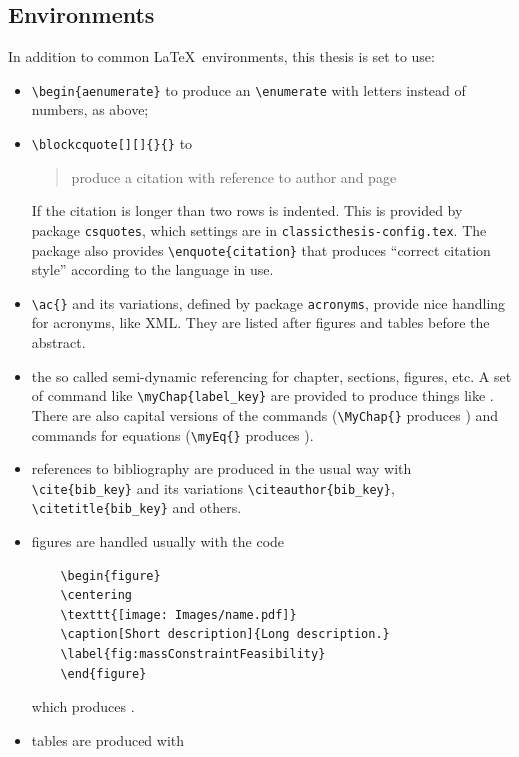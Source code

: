 \subsection{Environments}
In addition to common \LaTeX\ environments, this thesis is set to
use:
\begin{itemize}
	\item \verb!\begin{aenumerate}! to produce an \verb!\enumerate!
	with letters instead of numbers, as above;
	\item \verb!\blockcquote[][]{}{}! to
	\blockcquote[see][p. 111]{bringhurst:2002}{produce a citation
	with reference to author and page}. If the citation is longer
	than two rows is indented. This is provided by package
	\verb!csquotes!, which settings are in
	\verb!classicthesis-config.tex!. The package also provides
	\verb!\enquote{citation}! that produces \enquote{correct citation
	style} according to the language in use.
	\item \verb!\ac{}! and its variations, defined by package
	\verb!acronyms!, provide nice handling for acronyms, like
	\ac{XML}. They are listed after figures and tables before the
	abstract.
	\item the so called semi-dynamic referencing for chapter,
	sections, figures, etc. A set of command like
	\verb!\myChap{label_key}! are provided to produce things like
	. There are also capital versions of the
	commands (\verb!\MyChap{}! produces ) and
	commands for equations (\verb!\myEq{}! produces
	).
	\item references to bibliography are produced in the usual way
	with \verb!\cite{bib_key}! \cite{bringhurst:2002} and its
	variations \verb!\citeauthor{bib_key}!,
	\verb!\citetitle{bib_key}! and others.
	\item figures are handled usually with the code
	\begin{verbatim}
	\begin{figure}
	\centering
	\texttt{[image: Images/name.pdf]} 
	\caption[Short description]{Long description.}
	\label{fig:massConstraintFeasibility}
	\end{figure}
	\end{verbatim}
	which produces .
	\item tables are produced with
	\begin{verbatim}

\end{verbatim}
\end{itemize}
